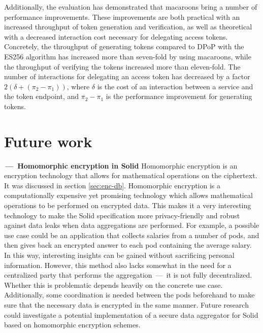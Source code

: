 Additionally, the evaluation has demonstrated that macaroons bring a number of performance improvements. These improvements are both practical with an increased throughput of token generation and verification, as well as theoretical with a decreased interaction cost necessary for delegating access tokens. Concretely, the throughput of generating tokens compared to \gls{DPoP} with the ES256 algorithm has increased more than seven-fold by using macaroons, while the throughput of verifying the tokens increased more than eleven-fold. The number of interactions for delegating an access token has decreased by a factor $2(\delta + (\pi_2 - \pi_1))$, where $\delta$ is the cost of an interaction between a service and the token endpoint, and $\pi_2 - \pi_1$ is the performance improvement for generating tokens.


\section{Future work}
\label{sec:future-work}
\begin{futurework}\label{fw:homomorphic-encryption}
\textbf{\,---\, Homomorphic encryption in Solid} Homomorphic encryption is an encryption technology that allows for mathematical operations on the ciphertext. It was discussed in section \ref{sec:enc-db}. Homomorphic encryption is a computationally expensive yet promising technology which allows mathematical operations to be performed on encrypted data. This makes it a very interesting technology to make the Solid specification more privacy-friendly and robust against data leaks when data aggregations are performed. For example, a possible use case could be an application that collects salaries from a number of pods, and then gives back an encrypted answer to each pod containing the average salary. In this way, interesting insights can be gained without sacrificing personal information. However, this method also lacks somewhat in the need for a centralized party that performs the aggregation \,---\, it is not fully decentralized. Whether this is problematic depends heavily on the concrete use case. Additionally, some coordination is needed between the pods beforehand to make sure that the necessary data is encrypted in the same manner. Future research could investigate a potential implementation of a secure data aggregator for Solid based on homomorphic encryption schemes.
\end{futurework}

